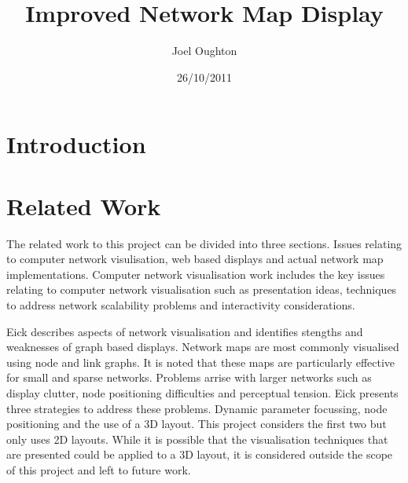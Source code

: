 \documentclass[11pt, a4paper]{article}
\title{Improved Network Map Display}
\author{Joel Oughton}
\date{26/10/2011}
\begin{document}
\maketitle

\begin{abstract}

\end{abstract}

\section{Introduction}
\label{sec:introduction}

\section{Related Work}
\label{sec:related-work}


The related work to this project can be divided into three sections. Issues
relating to computer network visulisation, web based displays and actual network
map implementations. Computer network visualisation work includes the key issues
relating to computer network visualisation such as presentation ideas,
techniques to address network scalability problems and interactivity
considerations.

Eick describes aspects of network visualisation and identifies stengths and
weaknesses of graph based displays.\cite{Eick_1996} Network maps are most
commonly visualised using node and link graphs. It is noted that these maps are
particularly effective for small and sparse networks. Problems arrise with
larger networks such as display clutter, node positioning difficulties and
perceptual tension. Eick presents three strategies to address these problems.
Dynamic parameter focussing, node positioning and the use of a 3D layout. This
project considers the first two but only uses 2D layouts. While it is possible
that the visualisation techniques that are presented could be applied to a 3D
layout, it is considered outside the scope of this project and left to future
work.
\end{document}

